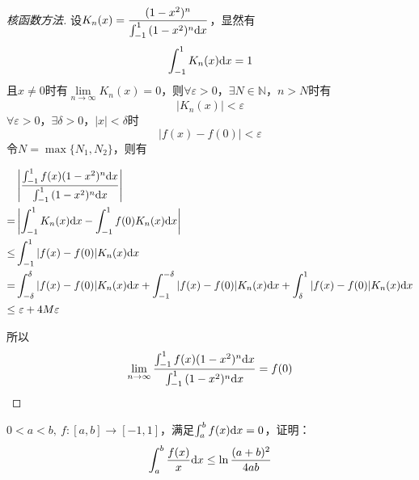 \begin{proof}[核函数方法]

    设$K_n(x) = \dfrac{(1 - x^2)^n}{\int_{-1}^{1}{(1 - x^2)^n}\mathrm{d} x}$，显然有
    $$\int_{-1}^{1}{K_n(x)}\mathrm{d} x = 1$$
    且$x \neq 0$时有$\lim\limits_{n\to\infty}{K_n(x)} = 0$，则$\forall \varepsilon >0$，$\exists N \in \mathbb{N}$，$n > N$时有
    $$|K_n(x)| < \varepsilon$$
    $\forall \varepsilon >0$，$\exists \delta > 0$，$|x| < \delta$时
    $$| f(x) - f(0) | < \varepsilon$$
    令$N = \max\{N_1, N_2\}$，则有

    \begin{align*}
        & \left| \dfrac{\int_{-1}^{1}{f(x)(1 - x^2)^n}\mathrm{d} x}{\int_{-1}^{1}{(1 - x^2)^n}\mathrm{d} x} \right| \\
        = & \left| \int_{-1}^{1}{K_n(x)}\mathrm{d} x - \int_{-1}^{1}{f(0)K_n(x)}\mathrm{d} x \right| \\
        \leq & \int_{-1}^{1}{|f(x) - f(0)|K_n(x)}\mathrm{d} x \\
        = & \int_{-\delta}^{\delta}{|f(x) - f(0)|K_n(x)}\mathrm{d} x + \int_{-1}^{-\delta}{|f(x) - f(0)|K_n(x)}\mathrm{d} x + \int_{\delta}^{1}{|f(x) - f(0)|K_n(x)}\mathrm{d} x \\
        \leq & \  \varepsilon + 4M\varepsilon
    \end{align*}

    所以
    $$\lim\limits_{n\to\infty}{\dfrac{\int_{-1}^{1}{f(x)(1 - x^2)^n}\mathrm{d} x}{\int_{-1}^{1}{(1 - x^2)^n}\mathrm{d} x}} = f(0)$$

\end{proof}

\begin{proposition}

    $0 < a < b,\ f:[a,b] \to [-1,1]$，满足$\int_{a}^{b}{f(x)}\mathrm{d} x = 0$，证明：
    $$\int_{a}^{b}{\dfrac{f(x)}{x}}\mathrm{d} x \leq \ln{\dfrac{(a+b)^2}{4ab}}$$

\end{proposition}

